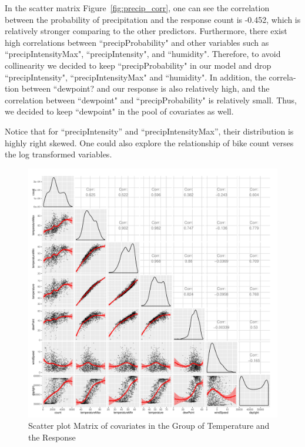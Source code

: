 \documentclass [11pt, proquest] {uwthesis}[2015/03/03]
\begin{document}
In the scatter matrix Figure~\ref{fig:precip_corr}, one can see the correlation between the probability of precipitation and the response count is -0.452, which is relatively stronger comparing to the other predictors. Furthermore, there exist high correlations between ``precipProbability" and other variables such as ``precipIntensityMax", ``precipIntensity", and ``humidity". Therefore, to avoid collinearity we decided to keep ``precipProbability" in our model and drop ``precipIntensity", ``precipIntensityMax" and ``humidity". In addition, the correla- tion between ``dewpoint? and our response is also relatively high, and the correlation between ``dewpoint" and ``precipProbability" is relatively small. Thus, we decided to keep ``dewpoint" in the pool of covariates as well.

Notice that for ``precipIntensity'' and ``precipIntensityMax'', their distribution is highly right skewed. One could also explore the relationship of bike count verses the log transformed variables.

\begin{figure}
   \includegraphics[width=1\textwidth]{figures/matrix2} 
  \caption{Scatter plot Matrix of covariates in the Group of Temperature and the Response}
  \label{fig:temp_corr}
\end{figure}
\end{document}
